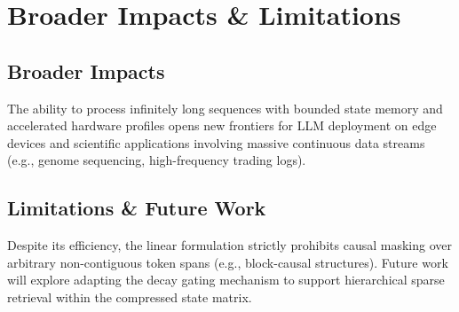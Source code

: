\section{Broader Impacts \& Limitations}
\label{sec:impacts}

\subsection{Broader Impacts}
The ability to process infinitely long sequences with bounded state memory and accelerated hardware profiles opens new frontiers for LLM deployment on edge devices and scientific applications involving massive continuous data streams (e.g., genome sequencing, high-frequency trading logs).

\subsection{Limitations \& Future Work}
Despite its efficiency, the linear formulation strictly prohibits causal masking over arbitrary non-contiguous token spans (e.g., block-causal structures). Future work will explore adapting the decay gating mechanism to support hierarchical sparse retrieval within the compressed state matrix.
